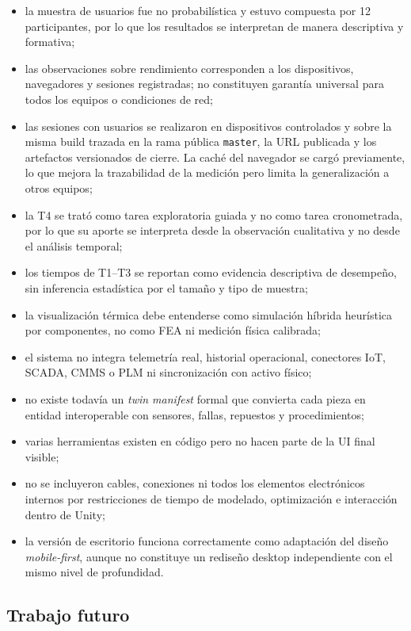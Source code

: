 \begin{itemize}
    \item la muestra de usuarios fue no probabilística y estuvo compuesta por 12 participantes, por lo que los resultados se interpretan de manera descriptiva y formativa;
    \item las observaciones sobre rendimiento corresponden a los dispositivos, navegadores y sesiones registradas; no constituyen garantía universal para todos los equipos o condiciones de red;
    \item las sesiones con usuarios se realizaron en dispositivos controlados y sobre la misma build trazada en la rama pública \texttt{master}, la URL publicada y los artefactos versionados de cierre. La caché del navegador se cargó previamente, lo que mejora la trazabilidad de la medición pero limita la generalización a otros equipos;
    \item la T4 se trató como tarea exploratoria guiada y no como tarea cronometrada, por lo que su aporte se interpreta desde la observación cualitativa y no desde el análisis temporal;
    \item los tiempos de T1--T3 se reportan como evidencia descriptiva de desempeño, sin inferencia estadística por el tamaño y tipo de muestra;
    \item la visualización térmica debe entenderse como simulación híbrida heurística por componentes, no como FEA ni medición física calibrada;
    \item el sistema no integra telemetría real, historial operacional, conectores IoT, SCADA, CMMS o PLM ni sincronización con activo físico;
    \item no existe todavía un \textit{twin manifest} formal que convierta cada pieza en entidad interoperable con sensores, fallas, repuestos y procedimientos;
    \item varias herramientas existen en código pero no hacen parte de la UI final visible;
    \item no se incluyeron cables, conexiones ni todos los elementos electrónicos internos por restricciones de tiempo de modelado, optimización e interacción dentro de Unity;
    \item la versión de escritorio funciona correctamente como adaptación del diseño \textit{mobile-first}, aunque no constituye un rediseño desktop independiente con el mismo nivel de profundidad.
\end{itemize}

\subsection{Trabajo futuro}

